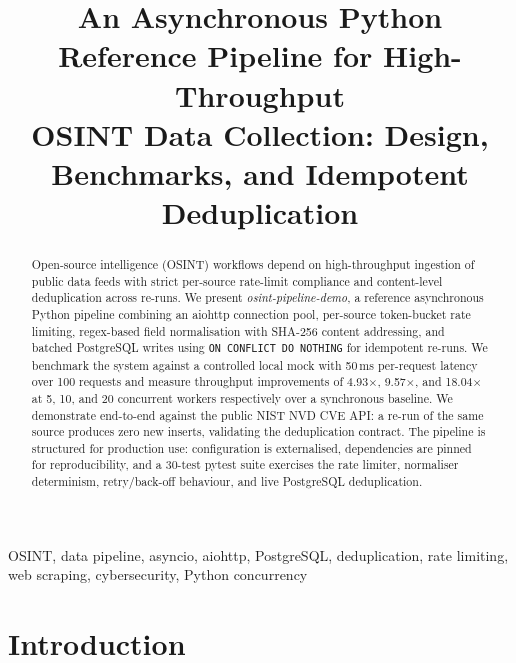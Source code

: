 \documentclass[conference]{IEEEtran}
\begin{document}
\title{An Asynchronous Python Reference Pipeline for High-Throughput\\
OSINT Data Collection: Design, Benchmarks, and Idempotent Deduplication}

\author{
}

\maketitle

\begin{abstract}
Open-source intelligence (OSINT) workflows depend on high-throughput
ingestion of public data feeds with strict per-source rate-limit
compliance and content-level deduplication across re-runs. We present
\emph{osint-pipeline-demo}, a reference asynchronous Python pipeline
combining an aiohttp connection pool, per-source token-bucket rate
limiting, regex-based field normalisation with SHA-256 content
addressing, and batched PostgreSQL writes using
\texttt{ON CONFLICT DO NOTHING} for idempotent re-runs. We benchmark
the system against a controlled local mock with 50\,ms per-request
latency over 100 requests and measure throughput improvements of
4.93$\times$, 9.57$\times$, and 18.04$\times$ at 5, 10, and 20
concurrent workers respectively over a synchronous baseline. We
demonstrate end-to-end against the public NIST NVD CVE API: a
re-run of the same source produces zero new inserts, validating
the deduplication contract. The pipeline is structured for
production use: configuration is externalised, dependencies are
pinned for reproducibility, and a 30-test pytest suite exercises
the rate limiter, normaliser determinism, retry/back-off behaviour,
and live PostgreSQL deduplication.
\end{abstract}

\begin{IEEEkeywords}
OSINT, data pipeline, asyncio, aiohttp, PostgreSQL, deduplication,
rate limiting, web scraping, cybersecurity, Python concurrency
\end{IEEEkeywords}

\section{Introduction}
\end{document}
